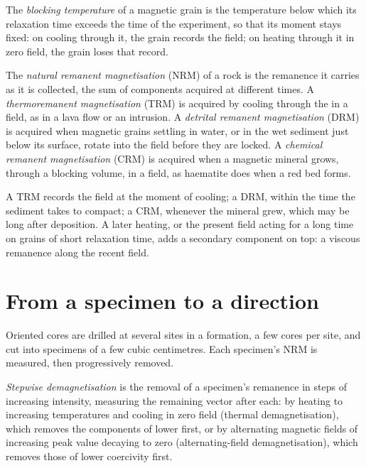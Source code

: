 \begin{definition}\label{def:b3:palaeomagnetism:blocking}
The \emph{blocking temperature} of a magnetic grain
is the temperature below which its relaxation time exceeds the time of the
experiment, so that its moment stays fixed: on cooling through it, the grain
records the field; on heating through it in zero field, the grain loses that
record.
\end{definition}

\begin{definition}\label{def:b3:palaeomagnetism:nrm}
The \emph{natural remanent magnetisation}
(NRM) of a rock is the remanence it carries as it is collected, the sum of
components acquired at different times. A \emph{thermoremanent
magnetisation} (TRM) is acquired by cooling
through the  in a field, as in a lava flow or an
intrusion. A \emph{detrital remanent magnetisation}
(DRM) is acquired when magnetic grains settling in water, or in
the wet sediment just below its surface, rotate into the field before they are
locked. A \emph{chemical remanent magnetisation}
(CRM) is acquired when a magnetic mineral grows, through a
blocking volume, in a field, as haematite does when a red bed forms.
\end{definition}

A TRM records the field at the moment of cooling; a DRM, within the time the
sediment takes to compact; a CRM, whenever the mineral grew, which may be long
after deposition. A later heating, or the present field acting for a long time
on grains of short relaxation time, adds a secondary component on top: a
viscous remanence along the recent field.

\section{From a specimen to a direction}

Oriented cores are drilled at several sites in a formation, a few cores per
site, and cut into specimens of a few cubic centimetres. Each specimen's NRM is
measured, then progressively removed.

\begin{definition}\label{def:b3:palaeomagnetism:demag}
\emph{Stepwise demagnetisation} is the removal
of a specimen's remanence in steps of increasing intensity, measuring the
remaining vector after each: by heating to increasing temperatures and cooling
in zero field (thermal demagnetisation), which removes the components of lower
 first, or by alternating magnetic fields of increasing
peak value decaying to zero (alternating-field demagnetisation), which removes
those of lower coercivity first.
\end{definition}

